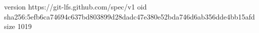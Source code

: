 version https://git-lfs.github.com/spec/v1
oid sha256:5efb6ca74694c637bd803899d28dadc47e380e52bda746d6ab356dde4bb15afd
size 1019
